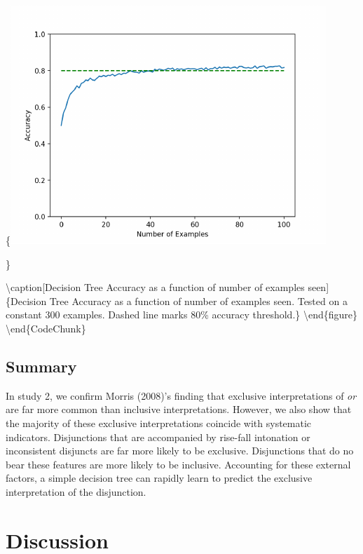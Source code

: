 \documentclass[10pt, letterpaper]{article}
\begin{document}
\{\centering \includegraphics{figs/learningCurve-1}

\}

\textbackslash{}caption{[}Decision Tree Accuracy as a function of number
of examples seen{]}\{Decision Tree Accuracy as a function of number of
examples seen. Tested on a constant 300 examples. Dashed line marks 80\%
accuracy threshold.\}\label{fig:learningCurve}
\textbackslash{}end\{figure\} \textbackslash{}end\{CodeChunk\}

\subsection{Summary}\label{summary-1}

In study 2, we confirm Morris (2008)'s finding that exclusive
interpretations of \emph{or} are far more common than inclusive
interpretations. However, we also show that the majority of these
exclusive interpretations coincide with systematic indicators.
Disjunctions that are accompanied by rise-fall intonation or
inconsistent disjuncts are far more likely to be exclusive. Disjunctions
that do no bear these features are more likely to be inclusive.
Accounting for these external factors, a simple decision tree can
rapidly learn to predict the exclusive interpretation of the
disjunction.

\section{Discussion}\label{discussion}
\end{document}
